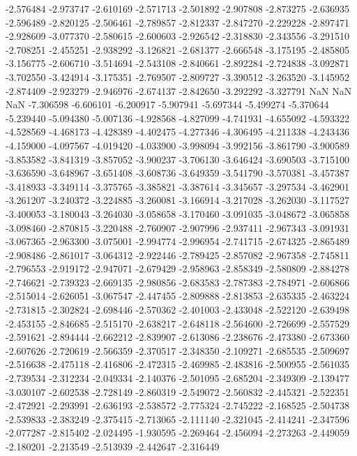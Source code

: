 -2.576484
-2.973747
-2.610169
-2.571713
-2.501892
-2.907808
-2.873275
-2.636935
-2.596489
-2.820125
-2.506461
-2.789857
-2.812337
-2.847270
-2.229228
-2.897471
-2.928609
-3.077370
-2.580615
-2.600603
-2.926542
-2.318830
-2.343556
-3.291510
-2.708251
-2.455251
-2.938292
-3.126821
-2.681377
-2.666548
-3.175195
-2.485805
-3.156775
-2.606710
-3.514694
-2.543108
-2.840661
-2.892284
-2.724838
-3.092871
-3.702550
-3.424914
-3.175351
-2.769507
-2.809727
-3.390512
-3.263520
-3.145952
-2.874409
-2.923279
-2.946976
-2.674137
-2.842650
-3.292292
-3.327791
NaN
NaN
NaN
-7.306598
-6.606101
-6.200917
-5.907941
-5.697344
-5.499274
-5.370644
-5.239440
-5.094380
-5.007136
-4.928568
-4.827099
-4.741931
-4.655092
-4.593322
-4.528569
-4.468173
-4.428389
-4.402475
-4.277346
-4.306495
-4.211338
-4.243436
-4.159000
-4.097567
-4.019420
-4.033900
-3.998094
-3.992156
-3.861790
-3.900589
-3.853582
-3.841319
-3.857052
-3.900237
-3.706130
-3.646424
-3.690503
-3.715100
-3.636590
-3.648967
-3.651408
-3.608736
-3.649359
-3.541790
-3.570381
-3.457387
-3.418933
-3.349114
-3.375765
-3.385821
-3.387614
-3.345657
-3.297534
-3.462901
-3.261207
-3.240372
-3.224885
-3.260081
-3.166914
-3.217028
-3.262030
-3.117527
-3.400053
-3.180043
-3.264030
-3.058658
-3.170460
-3.091035
-3.048672
-3.065858
-3.098460
-2.870815
-3.220488
-2.760907
-2.907996
-2.937411
-2.967343
-3.091931
-3.067365
-2.963300
-3.075001
-2.994774
-2.996954
-2.741715
-2.674325
-2.865489
-2.908486
-2.861017
-3.064312
-2.922446
-2.789425
-2.857082
-2.967358
-2.745811
-2.796553
-2.919172
-2.947071
-2.679429
-2.958963
-2.858349
-2.580809
-2.884278
-2.746621
-2.739323
-2.669135
-2.980856
-2.683583
-2.787383
-2.784971
-2.606866
-2.515014
-2.626051
-3.067547
-2.447455
-2.809888
-2.813853
-2.635335
-2.463224
-2.731815
-2.302824
-2.698446
-2.570362
-2.401003
-2.433048
-2.522120
-2.639498
-2.453155
-2.846685
-2.515170
-2.638217
-2.648118
-2.564600
-2.726699
-2.557529
-2.591621
-2.894444
-2.662212
-2.839907
-2.613086
-2.238676
-2.473380
-2.673360
-2.607626
-2.720619
-2.566359
-2.370517
-2.348350
-2.109271
-2.685535
-2.509697
-2.516638
-2.475118
-2.416806
-2.472315
-2.469985
-2.483816
-2.500955
-2.561035
-2.739534
-2.312234
-2.049334
-2.140376
-2.501095
-2.685204
-2.349309
-2.139477
-3.030107
-2.602538
-2.728149
-2.860319
-2.549072
-2.560832
-2.445321
-2.522351
-2.472921
-2.293991
-2.636193
-2.538572
-2.775324
-2.745222
-2.168525
-2.504738
-2.539833
-2.383249
-2.375415
-2.713065
-2.111140
-2.321045
-2.414241
-2.347596
-2.077287
-2.815402
-2.024495
-1.930595
-2.269464
-2.456094
-2.273263
-2.449059
-2.180201
-2.213549
-2.513939
-2.442647
-2.316449
